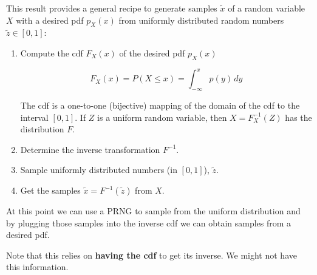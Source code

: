 \begin{frame}


This result provides 
a general recipe to generate
samples $\tilde x$ of a random variable $X$ with a desired pdf $p_X(x)$
from uniformly distributed random numbers $\tilde z \in [0,1]$:
\begin{enumerate}
\item Compute the cdf $F_X(x)$ of the desired pdf $p_X(x)$

\begin{equation}
F_X(x) = P(X \leq x) = \int_{-\infty}^{x} p(y)\,dy
\end{equation}

The cdf is a one-to-one (bijective) mapping of the domain of the cdf to the interval $[0,1]$.
 If $Z$ is a uniform random variable, then $X=F_X^{-1}(Z)$ has the distribution $F$.

\item Determine the inverse transformation $F^{-1}$.

\item Sample uniformly distributed numbers (in $[0,1]$), $\tilde z$.
\item Get the samples $\tilde x=F^{-1}(\tilde z)$ from $X$. 
\end{enumerate}

At this point we can use a PRNG to sample from the uniform distribution and 
by plugging those samples into the inverse cdf we can obtain samples from a desired pdf.


\end{frame}

\begin{frame}

Note that this relies on \textbf{having the cdf} to get its inverse. We might not have this information.

\pause


\end{frame}
